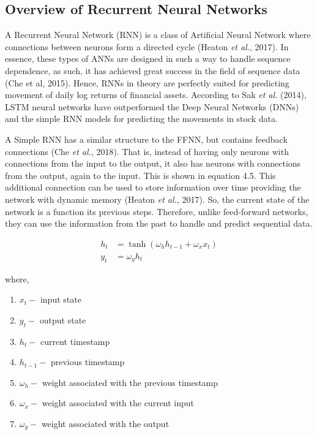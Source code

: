 \subsection{Overview of Recurrent Neural Networks}
A Recurrent Neural Network (RNN) is a class of Artificial Neural Network where connections between neurons form a directed cycle (Heaton \textit{et al.}, 2017).  In essence, these types of ANNs are designed in such a way to handle sequence dependence, as such, it has achieved great success in the field of sequence data (Che et al, 2015). Hence, RNNs in theory are perfectly suited for predicting movement of daily log returns of financial assets. According to Sak \textit{et al.} (2014), LSTM neural networks have outperformed the Deep Neural Networks (DNNs) and the simple RNN models for predicting the movements in stock data. 

A Simple RNN has a similar structure to the FFNN, but contains feedback connections (Che \textit{et al.}, 2018). That is, instead of having only neurons with connections from the input to the output, it also has neurons with connections from the output, again to the input. This is shown in equation 4.5. This additional connection can be used to store information over time providing the network with dynamic memory (Heaton \textit{et al.}, 2017). So, the current state of the network is a function its previous steps. Therefore, unlike feed-forward networks, they can use the information from the past to handle and predict sequential data. 

\begin{equation}
\begin{aligned}
h_{t} &=\tanh \left(\omega_{h} h_{t-1}+\omega_{x} x_{t}\right) \\
y_{t} &=\omega_{y} h_{t}
\end{aligned}
\end{equation}

where,

\begin{enumerate}
\item $x_{t}-$ input state
\item $y_{t}-$ output state
\item $h_{t}-$ current timestamp
\item $h_{t-1}-$ previous timestamp
\item $\omega_{h}-$ weight associated with the previous timestamp
\item $\omega_{x}-$ weight associated with the current input
\item $\omega_{y}-$ weight associated with the output
\end{enumerate}

